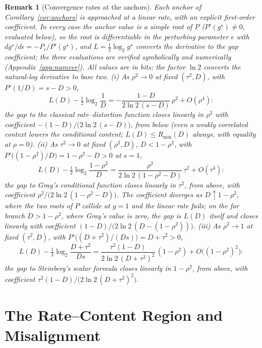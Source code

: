 ﻿\documentclass[11pt,onecolumn]{IEEEtran}
\newtheorem{remark}[theorem]{Remark}
\begin{document}
\begin{remark}[Convergence rates at the anchors]\label{rem:anchorrates}
Each anchor of Corollary~\ref{cor:anchors} is approached at a linear
rate, with an explicit first-order coefficient. In every case the
anchor value is a simple root of $P$ ($P'(g^\star)\ne0$, evaluated
below), so the root is differentiable in the perturbing parameter
$\epsilon$ with $dg^\star/d\epsilon=-P_\epsilon/P'(g^\star)$, and
$L=\tfrac12\log_2 g^\star$ converts the derivative to the gap
coefficient; the three evaluations are verified symbolically and
numerically (Appendix~\ref{app:numver}). All values are in bits; the
factor $\ln2$ converts the natural-log derivative to base two.
(i) As $\rho^2\to0$ at fixed $(\tau^2,D)$, with $P'(1/D)=s-D>0$,
\[
L(D)-\tfrac12\log_2\frac1D
=-\frac{1-D}{2\ln2\,(s-D)}\,\rho^2+O(\rho^4):
\]
the gap to the classical rate--distortion function closes linearly in
$\rho^2$ with coefficient $-(1-D)/\bigl(2\ln2\,(s-D)\bigr)$, from
below (even a weakly correlated context lowers the conditional
content; $L(D)\le R_{\min}(D)$ always, with equality at $\rho=0$).
(ii) As $\tau^2\to0$ at fixed $(\rho^2,D)$, $D<1-\rho^2$, with
$P'\bigl((1-\rho^2)/D\bigr)=1-\rho^2-D>0$ at $s=1$,
\[
L(D)-\tfrac12\log_2\frac{1-\rho^2}{D}
=\frac{\rho^2}{2\ln2\,(1-\rho^2-D)}\,\tau^2+O(\tau^4):
\]
the gap to Gray's conditional function closes linearly in $\tau^2$,
from above, with coefficient $\rho^2/\bigl(2\ln2\,(1-\rho^2-D)\bigr)$.
The coefficient diverges as $D\uparrow1-\rho^2$, where the two roots of
$P$ collide at $g=1$ and the linear rate fails; on the far branch
$D>1-\rho^2$, where Gray's value is zero, the gap is $L(D)$ itself and
closes linearly with coefficient
$(1-D)/\bigl(2\ln2\,(D-(1-\rho^2))\bigr)$.
(iii) As $\rho^2\to1$ at fixed $(\tau^2,D)$, with
$P'\bigl((D+\tau^2)/(Ds)\bigr)=D+\tau^2>0$,
\[
L(D)-\tfrac12\log_2\frac{D+\tau^2}{Ds}
=\frac{\tau^2(1-D)}{2\ln2\,(D+\tau^2)^2}\,(1-\rho^2)
+O\bigl((1-\rho^2)^2\bigr):
\]
the gap to Steinberg's scalar formula closes linearly in $1-\rho^2$,
from above, with coefficient
$\tau^2(1-D)/\bigl(2\ln2\,(D+\tau^2)^2\bigr)$.
\end{remark}

\section{The Rate--Content Region and Misalignment}
\label{sec:region}
\end{document}
